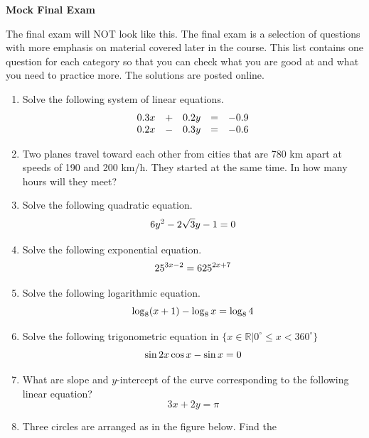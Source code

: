 \documentclass[11pt]{article}
\begin{document}
\textbf{Mock Final Exam}

The final exam will NOT look like this. The final exam is a selection
of questions with more emphasis on material covered later in the
course. This list contains one question for each category so that you
can check what you are good at and what you need to practice more. The
solutions are posted online.

\begin{enumerate}
\item Solve the following system of linear equations.
  \begin{equation}
    \label{eq:oedeoyai}
    \begin{array}{lclcr}
      0.3x & + & 0.2y & = & -0.9 \\
      0.2x & - & 0.3y & = & -0.6
    \end{array}\notag
  \end{equation}
\item Two planes travel toward each other from cities that are 780 km
  apart at speeds of 190 and 200 km/h. They started at the same time.
  In how many hours will they meet?
\item Solve the following quadratic equation.
  \begin{equation}
    \label{eq:eishahji}
    6y^{2}-2\sqrt{3}y-1=0\notag
  \end{equation}
\item Solve the following exponential equation.
  \begin{equation}
    \label{eq:vohtovuj}
    25^{3x-2}=625^{2x+7}\notag
  \end{equation}
\item Solve the following logarithmic equation.
  \begin{equation}
    \label{eq:laishedu}
    \log_{8}(x+1)-\log_{8}x=\log_{8}4\notag
  \end{equation}
\item Solve the following trigonometric equation in $\{x\in\mathbb{R}|0^{\circ}\leq{}x<360^{\circ}\}$
  \begin{equation}
    \label{eq:iegheovi}
    \sin{}2x\cos{}x-\sin{}x=0\notag
  \end{equation}
\item What are slope and $y$-intercept of the curve corresponding to
  the following linear equation?
  \begin{equation}
    \label{eq:eopifeek}
    3x+2y=\pi
  \end{equation}
  \newpage
\item Three circles are arranged as in the figure below. Find the

\end{enumerate}
\end{document}
